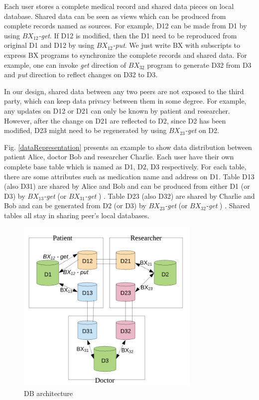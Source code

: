 \documentclass[conference]{IEEEtran}
\begin{document}
Each user stores a complete medical record and shared data pieces on local database. Shared data can be seen as views which can be produced from complete records named as sources. For example, D12 can be made from D1 by using  \emph{$BX_{12}$-get}. If D12 is modified, then the D1 need to be reproduced from original D1 and D12 by using  \emph{$BX_{12}$-put}. We just write BX with subscripts to express BX programs to synchronize the complete records and shared data. For example, one can invoke \emph{get} direction of  \emph{$BX_{32}$} program to generate D32 from D3 and \emph{put} direction to reflect changes on D32 to D3.

In our design, shared data between any two peers are not exposed to the third party, which can keep data privacy between them in some degree. For example, any updates on D12 or D21 can only be known by patient and researcher. However, after the change on D21 are reflected to D2, since D2 has been modified, D23 might need to be regenerated by using \emph{$BX_{23}$-get} on D2.

Fig. \ref{dataRepresentation} presents an example to show data distribution between patient Alice, doctor Bob and researcher Charlie. Each user have their own complete base table which is named as D1, D2, D3 respectively. For each table, there are some attributes such as medication name and address on D1. Table D13 (also D31) are shared by Alice and Bob and can be produced from either D1 (or D3) by \emph{$BX_{13}$-get} (or \emph{$BX_{31}$-get} ) . Table D23 (also D32) are shared by Charlie and Bob and can be generated from D2 (or D3) by \emph{$BX_{23}$-get} (or \emph{$BX_{32}$-get} ) .  Shared tables all stay in sharing peer's local databases. 

\begin{figure}[htbp]
	\centerline{\includegraphics[width=250pt]{DBStructure.png}}
	\caption{DB architecture}
	\label{DB architecture}
\end{figure}
\end{document}
